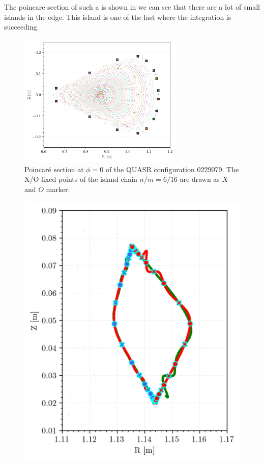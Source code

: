 The poincare section of such a is shown in  we can see that there are a lot of small islands in the edge. This island is one of the last where the integration is succeeding

\begin{figure}[H]
    \centering
    \includegraphics[width=0.7\textwidth]{images/quasrs/fixedpoint_0229079_1.png}
    \caption{Poincaré section at $\phi=0$ of the QUASR configuration 0229079. The X/O fixed points of the island chain $n/m = 6/16$ are drawn as $X$ and $O$ marker.}
    \label{fig:0229079-p}
\end{figure}

\begin{figure}[H]
    \centering
    \includegraphics[width=\textwidth]{images/quasrs/clinic_outer_0229079.png}
    \caption{}
    \label{fig:0229079-turn}
\end{figure}

